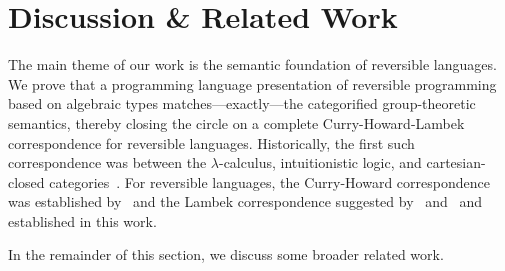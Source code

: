 \section{Discussion \& Related Work}
\label{sec:discussion}


The main theme of our work is the semantic foundation of reversible languages. We prove that a programming language
presentation of reversible programming based on algebraic types matches---exactly---the categorified group-theoretic
semantics, thereby closing the circle on a complete Curry-Howard-Lambek correspondence for reversible
languages. Historically, the first such correspondence was between the $\lambda$-calculus, intuitionistic logic, and
cartesian-closed categories~\cite{curryCurryEssaysCombinatory1980}. For reversible languages, the Curry-Howard
correspondence was established by~\citet{sparksSuperstructuralReversibleLogic2014} and the Lambek correspondence
suggested by~\citet{Carette2016} and~\citet{threemodels} and established in this work.

In the remainder of this section, we discuss some broader related work.


